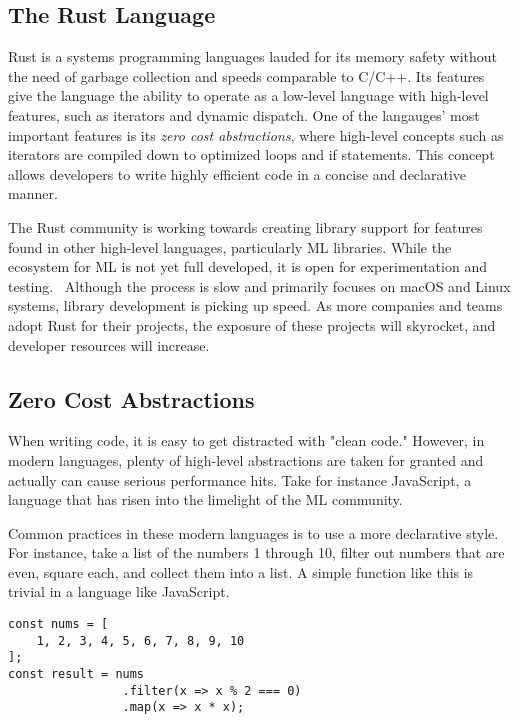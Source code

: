 \begin{multicols}{2}
\tableofcontents
\section{The Rust Language}
Rust is a systems programming languages lauded for its memory safety without the need of garbage collection and speeds
comparable to C/C++. Its features give the language the ability to operate as a low-level language with high-level
features, such as iterators and dynamic dispatch. One of the langauges' most important features is its \textit{zero cost
abstractions}, where high-level concepts such as iterators are compiled down to optimized loops and if statements. This
concept allows developers to write highly efficient code in a concise and declarative manner.

The Rust community is working towards creating library support for features found in other high-level languages,
particularly ML libraries. While the ecosystem for ML is not yet full developed, it is open for experimentation and
testing.~\cite{arewelearningyet} Although the process is slow and primarily focuses on macOS and Linux systems, library
development is picking up speed. As more companies and teams adopt Rust for their projects, the exposure of these
projects will skyrocket, and developer resources will increase.

\subsection{Zero Cost Abstractions}
When writing code, it is easy to get distracted with "clean code." However, in modern languages, plenty of high-level
abstractions are taken for granted and actually can cause serious performance hits. Take for instance JavaScript, a
language that has risen into the limelight of the ML community.

Common practices in these modern languages is to use a more declarative style. For instance, take a list of the numbers
1 through 10, filter out numbers that are even, square each, and collect them into a list. A simple function like this
is trivial in a language like JavaScript.

\vspace{\baselineskip}
\noindent
\begin{minipage}[]{\linewidth}
\begin{verbatim}
const nums = [
    1, 2, 3, 4, 5, 6, 7, 8, 9, 10
];
const result = nums
                .filter(x => x % 2 === 0)
                .map(x => x * x);
\end{verbatim}
\end{minipage}
\vspace{\baselineskip}


\end{multicols}
